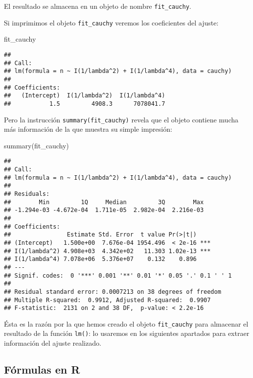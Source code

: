 \documentclass[
  degree=mecinf,
  title=normal,
  toc=normal,
  bib=normal]{mnye}
\newenvironment{Shaded}{\begin{snugshade}}{\end{snugshade}}
\newcommand{\FunctionTok}[1]{\textcolor[rgb]{0.00,0.00,0.00}{#1}}
\newcommand{\NormalTok}[1]{#1}
\begin{document}
El resultado se almacena en un objeto de nombre \texttt{fit\_cauchy}.

Si imprimimos el objeto \texttt{fit\_cauchy} veremos los coeficientes del ajuste:

\begin{Shaded}
\begin{Highlighting}[]
\NormalTok{fit\_cauchy}
\end{Highlighting}
\end{Shaded}

\begin{verbatim}
## 
## Call:
## lm(formula = n ~ I(1/lambda^2) + I(1/lambda^4), data = cauchy)
## 
## Coefficients:
##   (Intercept)  I(1/lambda^2)  I(1/lambda^4)  
##           1.5         4908.3      7078041.7
\end{verbatim}

Pero la instrucción \texttt{summary(fit\_cauchy)} revela que el objeto contiene mucha más información de la que muestra su simple impresión:

\begin{Shaded}
\begin{Highlighting}[]
\FunctionTok{summary}\NormalTok{(fit\_cauchy)}
\end{Highlighting}
\end{Shaded}

\begin{verbatim}
## 
## Call:
## lm(formula = n ~ I(1/lambda^2) + I(1/lambda^4), data = cauchy)
## 
## Residuals:
##        Min         1Q     Median         3Q        Max 
## -1.294e-03 -4.672e-04  1.711e-05  2.982e-04  2.216e-03 
## 
## Coefficients:
##                Estimate Std. Error  t value Pr(>|t|)    
## (Intercept)   1.500e+00  7.676e-04 1954.496  < 2e-16 ***
## I(1/lambda^2) 4.908e+03  4.342e+02   11.303 1.02e-13 ***
## I(1/lambda^4) 7.078e+06  5.376e+07    0.132    0.896    
## ---
## Signif. codes:  0 '***' 0.001 '**' 0.01 '*' 0.05 '.' 0.1 ' ' 1
## 
## Residual standard error: 0.0007213 on 38 degrees of freedom
## Multiple R-squared:  0.9912, Adjusted R-squared:  0.9907 
## F-statistic:  2131 on 2 and 38 DF,  p-value: < 2.2e-16
\end{verbatim}

Ésta es la razón por la que hemos creado el objeto \texttt{fit\_cauchy} para almacenar el resultado de la función \texttt{lm()}: lo usaremos en los siguientes apartados para extraer información del ajuste realizado.

\hypertarget{fuxf3rmulas-en-r}{%
\subsection{Fórmulas en R}\label{fuxf3rmulas-en-r}}
\end{document}
